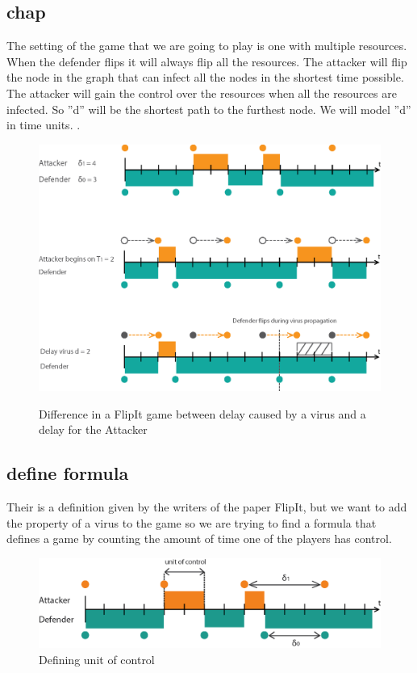 \subsection{chap}
The setting of the game that we are going to play is one with multiple resources. When the defender flips it will always flip all the resources. The attacker will flip the node in the graph that can infect all the nodes in the shortest time possible. The attacker will gain the control over the resources when all the resources are infected. So ''d'' will be the shortest path to the furthest node. We will model ''d'' in time units. .
\begin{figure}[hbtp]
\caption{Difference in a FlipIt game between delay caused by a virus and a delay for the Attacker}
\centering
\includegraphics[scale=1]{Images/Flipvirus}
\label{fig:virusflip}
\end{figure}




\subsection{define formula}
Their is a definition given by the writers of the paper FlipIt, but we want to add the property of a virus to the game so we are trying to find a formula that defines a game by counting the amount of time one of the players has control. \\
\begin{figure}[hbtp]
\caption{Defining unit of control}
\centering
\includegraphics[scale=1]{Images/FlipSpel.png}
\end{figure}


